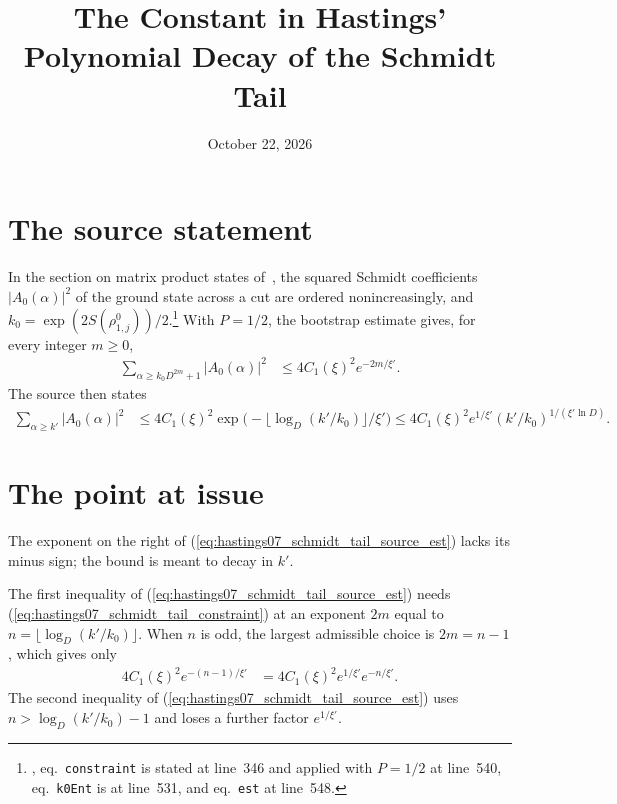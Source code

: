 \documentclass{article}
\title{The Constant in Hastings' Polynomial Decay of the Schmidt Tail}
\author{}
\date{October 22, 2026}
\begin{document}
\maketitle
{}

\section{The source statement}

In the section on matrix product states of~\cite{Hastings2007AreaLaw}, the
squared Schmidt coefficients $|A_0(\alpha)|^2$ of the ground state across a cut
are ordered nonincreasingly, and
$k_0=\exp(2S(\rho^0_{1,j}))/2$.\footnote{,
    eq.~\texttt{constraint} is stated at line~346 and applied with $P=1/2$
    at line~540, eq.~\texttt{k0Ent} is at line~531, and eq.~\texttt{est} at
    line~548.}
With $P=1/2$, the bootstrap estimate gives, for every integer $m\ge0$,
\begin{align}
    \sum_{\alpha\ge k_0D^{2m}+1}|A_0(\alpha)|^2
     & \le 4C_1(\xi)^2e^{-2m/\xi'}.
    \label{eq:hastings07_schmidt_tail_constraint}
\end{align}
The source then states
\begin{align}
    \sum_{\alpha\ge k'}|A_0(\alpha)|^2
     & \le 4C_1(\xi)^2\exp\bigl(-\lfloor\log_D(k'/k_0)\rfloor/\xi'\bigr)
    \le 4C_1(\xi)^2e^{1/\xi'}(k'/k_0)^{1/(\xi'\ln D)}.
    \label{eq:hastings07_schmidt_tail_source_est}
\end{align}

\section{The point at issue}

The exponent on the right of (\ref{eq:hastings07_schmidt_tail_source_est})
lacks its minus sign; the bound is meant to decay in $k'$.

The first inequality of (\ref{eq:hastings07_schmidt_tail_source_est}) needs
(\ref{eq:hastings07_schmidt_tail_constraint}) at an exponent $2m$ equal to
$n=\lfloor\log_D(k'/k_0)\rfloor$. When $n$ is odd, the largest admissible
choice is $2m=n-1$, which gives only
\begin{align}
    4C_1(\xi)^2e^{-(n-1)/\xi'}
     & = 4C_1(\xi)^2e^{1/\xi'}e^{-n/\xi'}.
    \label{eq:hastings07_schmidt_tail_odd}
\end{align}
The second inequality of (\ref{eq:hastings07_schmidt_tail_source_est}) uses
$n>\log_D(k'/k_0)-1$ and loses a further factor $e^{1/\xi'}$.
\end{document}

